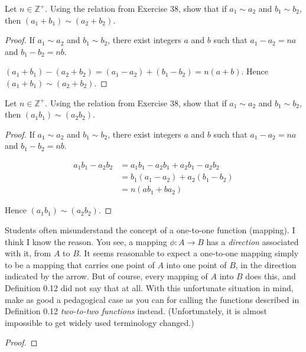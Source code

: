 \begin{exercise}
    Let $n\in\mathbb{Z}^{+}$. Using the relation from Exercise 38, show that if $a_{1} \sim a_{2}$ and $b_{1} \sim b_{2}$, then $(a_{1} + b_{1}) \sim (a_{2} + b_{2})$.
\end{exercise}

\begin{proof}
    If $a_{1} \sim a_{2}$ and $b_{1} \sim b_{2}$, there exist integers $a$ and $b$ such that $a_{1} - a_{2} = na$ and $b_{1} - b_{2} = nb$.

    $(a_{1} + b_{1}) - (a_{2} + b_{2}) = (a_{1} - a_{2}) + (b_{1} - b_{2}) = n(a + b)$. Hence $(a_{1} + b_{1}) \sim (a_{2} + b_{2})$.
\end{proof}

\begin{exercise}
    Let $n\in\mathbb{Z}^{+}$. Using the relation from Exercise 38, show that if $a_{1} \sim a_{2}$ and $b_{1} \sim b_{2}$, then $(a_{1}b_{1}) \sim (a_{2}b_{2})$.
\end{exercise}

\begin{proof}
    If $a_{1} \sim a_{2}$ and $b_{1} \sim b_{2}$, there exist integers $a$ and $b$ such that $a_{1} - a_{2} = na$ and $b_{1} - b_{2} = nb$.

    \begin{align*}
        a_{1}b_{1} - a_{2}b_{2} & = a_{1}b_{1} - a_{2}b_{1} + a_{2}b_{1} - a_{2}b_{2} \\
                                & = b_{1}(a_1 - a_{2}) + a_{2}(b_{1} - b_{2})         \\
                                & = n(ab_{1} + ba_{2})
    \end{align*}

    Hence $(a_{1}b_{1}) \sim (a_{2}b_{2})$.
\end{proof}

\begin{exercise}
    Students often misunderstand the concept of a one-to-one function (mapping). I think I know the reason. You see, a mapping $\phi: A \to B$ has a \textit{direction} associated with it, from $A$ to $B$. It seems reasonable to expect a one-to-one mapping simply to be a mapping that carries one point of $A$ into one point of $B$, in the direction indicated by the arrow. But of course, every mapping of $A$ into $B$ does this, and Definition 0.12 did not say that at all. With this unfortunate situation in mind, make as good a pedagogical case as you can for calling the functions described in Definition 0.12 \textit{two-to-two functions} instead. (Unfortunately, it is almost impossible to get widely used terminology changed.)
\end{exercise}

\begin{proof}
\end{proof}

